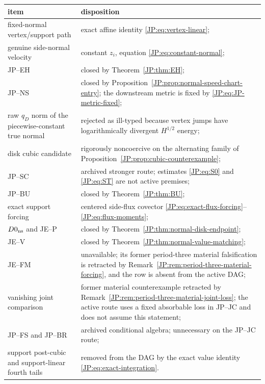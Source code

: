\begin{center}
\begin{longtable}{>{\raggedright\arraybackslash}p{.34\linewidth}
                  >{\raggedright\arraybackslash}p{.54\linewidth}}
\toprule
item & disposition\\
\midrule
fixed-normal vertex/support path & exact affine identity
\eqref{JP:eq:vertex-linear};\\
genuine side-normal velocity & constant $z_i$, equation
\eqref{JP:eq:constant-normal};\\
JP--EH & closed by Theorem~\ref{JP:thm:EH};\\
JP--NS & closed by Proposition~\ref{JP:prop:normal-speed-chart-entry}; the
downstream metric is fixed by \eqref{JP:eq:JP-metric-fixed};\\
raw $q_D$ norm of the piecewise-constant true normal & rejected as
ill-typed because vertex jumps have logarithmically divergent
$H^{1/2}$ energy;\\
disk cubic candidate & rigorously noncoercive on the alternating family of
Proposition~\ref{JP:prop:cubic-counterexample};\\
JP--SC & archived stronger route; estimates \eqref{JP:eq:S0} and
\eqref{JP:eq:ST} are not active premises;\\
JP--BU & closed by Theorem~\ref{JP:thm:BU};\\
exact support forcing & centered side-flux covector
\eqref{JP:eq:exact-flux-forcing}--\eqref{JP:eq:flux-moments};\\
$D0_{\rm ns}$ and JE--P & closed by
Theorem~\ref{JP:thm:normal-disk-endpoint};\\
JE--V & closed by Theorem~\ref{JP:thm:normal-value-matching};\\
JE--FM & unavailable; its former period-three material falsification is
retracted by Remark~\ref{JP:rem:period-three-material-forcing}, and the row is
absent from the active DAG;\\
vanishing joint comparison & former material counterexample retracted by
Remark~\ref{JP:rem:period-three-material-joint-loss}; the active route uses a
fixed absorbable loss in JP--JC and does not assume this statement;\\
JP--FS and JP--BR & archived conditional algebra; unnecessary on the
JP--JC route;\\
support post-cubic and support-linear fourth tails & removed from the DAG
by the exact value identity \eqref{JP:eq:exact-integration}.\\
\bottomrule
\end{longtable}
\end{center}
\endgroup
